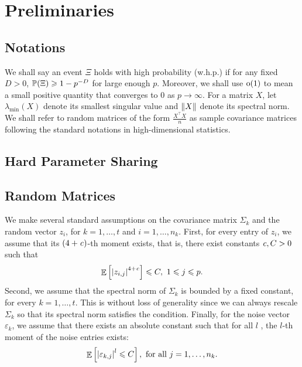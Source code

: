 \section{Preliminaries}



\subsection{Notations}
We shall say an event $\Xi$ holds with high probability (w.h.p.) if for any fixed $D>0$, $\P(\Xi)\ge 1- p^{-D}$ for large enough $p$. Moreover, we shall use $\oo(1)$ to mean a small positive quantity that converges to 0 as $p\to \infty$.
For a matrix $X$, let $\lambda_{\min}(X)$ denote its smallest singular value and $\norm{X}$ denote its spectral norm.
We shall refer to random matrices of the form $\frac {X^\top X} n$ as sample covariance matrices following the standard notations in high-dimensional statistics.


\subsection{Hard Parameter Sharing}


\subsection{Random Matrices}

We make several standard assumptions on the covariance matrix $\Sigma_k$ and the random vector $z_i$, for $k = 1,\dots, t$ and $i = 1,\dots, n_k$.
First, for every entry of $z_i$, we assume that its $(4+\e)$-th moment exists, that is, there exist constants $\e, C > 0$ such that
\begin{equation}\label{assmAhigh}
	\ex{\abs{z_{i,j}}^{4+\e}} \le C,\ 1\le j \le p.
\end{equation}
Second, we assume that the spectral norm of $\Sigma_k$ is bounded by a fixed constant, for every $k = 1,\dots, t$.
This is without loss of generality since we can always rescale $\Sigma_k$ so that its spectral norm satisfies the condition.
Finally, for the noise vector $\varepsilon_k$, we assume that there exists an absolute constant such that for all $l$ , the $l$-th moment of the noise entries exists:
\begin{align*}
	\ex{\abs{\varepsilon_{k, j}}^l \le C}, \text{ for all } j = 1, \dots, n_k.
\end{align*}



